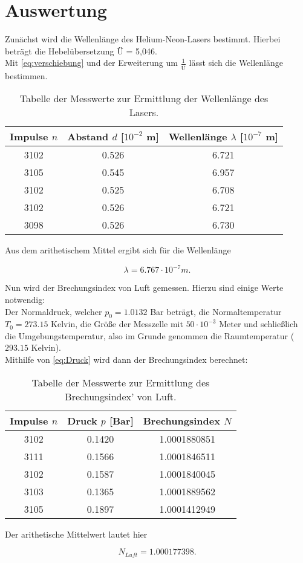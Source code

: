 \section{Auswertung}
\label{sec:Auswertung}

Zunächst wird die Wellenlänge des Helium-Neon-Lasers bestimmt. Hierbei beträgt die Hebelübersetzung Ü = 5,046.\\
Mit \autoref{eq:verschiebung} und der Erweiterung um \(\frac{1}{Ü}\) lässt sich die Wellenlänge bestimmen.

\begin{table}
  \centering
  \caption{Tabelle der Messwerte zur Ermittlung der Wellenlänge des Lasers.}
  \label{tab:tab1}
  \begin{tabular}{c | c | c}
    \toprule
    Impulse \(n\) & Abstand \(d\) [\(10^{-2}\) m] & Wellenlänge \(\lambda\) [\(10^{-7}\) m]\\
    \midrule
    3102 & 0.526 & 6.721\\
    3105 & 0.545 & 6.957\\
    3102 & 0.525 & 6.708\\
    3102 & 0.526 & 6.721\\
    3098 & 0.526 & 6.730\\
    \bottomrule
  \end{tabular}
\end{table}

Aus dem arithetischem Mittel ergibt sich für die Wellenlänge 

\begin{equation}
  \lambda = 6.767 \cdot 10^{-7} m.
\end{equation}

Nun wird der Brechungsindex von Luft gemessen. Hierzu sind einige Werte notwendig:\\
Der Normaldruck, welcher \(p_0 = 1.0132\) Bar beträgt, die Normaltemperatur \(T_0 = 273.15\) Kelvin, die Größe der Messzelle mit \(50 \cdot 10^{-3}\) Meter und schließlich die Umgebungstemperatur, also im Grunde genommen die Raumtemperatur (\(293.15\) Kelvin).\\
Mithilfe von \autoref{eq:Druck} wird dann der Brechungsindex berechnet:

\begin{table}
  \centering
  \caption{Tabelle der Messwerte zur Ermittlung des Brechungsindex' von Luft.}
  \label{tab:tab2}
  \begin{tabular}{c | c | c}
    \toprule
    Impulse \(n\) & Druck \(p\) [Bar] & Brechungsindex \(N\)\\
    \midrule
    3102 & 0.1420 & 1.0001880851\\
    3111 & 0.1566 & 1.0001846511\\
    3102 & 0.1587 & 1.0001840045\\
    3103 & 0.1365 & 1.0001889562\\
    3105 & 0.1897 & 1.0001412949\\
    \bottomrule
  \end{tabular}
\end{table}

Der arithetische Mittelwert lautet hier

\begin{equation}
  N_{Luft} = 1.000177398.
\end{equation}

